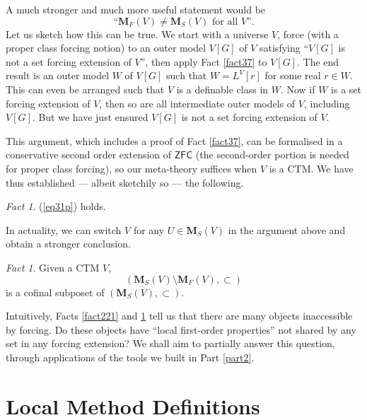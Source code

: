 \documentclass[12pt, twoside]{memoir}
\numberwithin{equation}{section}
\theoremstyle{definition}
\theoremstyle{remark}
\newtheorem{fact}[thm]{Fact}
\theoremstyle{definition}
\theoremstyle{definition}
\theoremstyle{definition}
\theoremstyle{remark}
\begin{document}
A much stronger and much more useful statement would be
\begin{equation}\label{eq31p}
    \text{``} \mathbf{M}_F(V) \neq \mathbf{M}_S(V) \text{ for all } V \text{''.}
\end{equation}
Let us sketch how this can be true. We start with a universe $V$, force (with a proper class forcing notion) to an outer model $V[G]$ of $V$ satisfying ``$V[G]$ is not a set forcing extension of $V$'', then apply Fact \ref{fact37} to $V[G]$. The end result is an outer model $W$ of $V[G]$ such that $W = L^V[r]$ for some real $r \in W$. This can even be arranged such that $V$ is a definable class in $W$. Now if $W$ is a set forcing extension of $V$, then so are all intermediate outer models of $V$, including $V[G]$. But we have just ensured $V[G]$ is not a set forcing extension of $V$. 

This argument, which includes a proof of Fact \ref{fact37}, can be formalised in a conservative second order extension of $\mathsf{ZFC}$ (the second-order portion is needed for proper class forcing), so our meta-theory suffices when $V$ is a CTM. We have thus established --- albeit sketchily so --- the following.

\begin{fact}\label{fact319}
(\ref{eq31p}) holds.
\end{fact}

In actuality, we can switch $V$ for any $U \in \mathbf{M}_S(V)$ in the argument above and obtain a stronger conclusion.

\begin{fact}\label{fact229}
Given a CTM $V$,
\begin{equation*}
    (\mathbf{M}_S(V) \setminus \mathbf{M}_F(V), \subset)
\end{equation*}
is a cofinal subposet of $(\mathbf{M}_S(V), \subset)$.
\end{fact}

Intuitively, Facts \ref{fact221} and \ref{fact229} tell us that there are many objects inaccessible by forcing. Do these objects have ``local first-order properties'' not shared by any set in any forcing extension? We shall aim to partially answer this question, through applications of the tools we built in Part \ref{part2}.

\section{Local Method Definitions}
\end{document}
